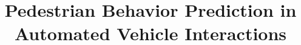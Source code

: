 \documentclass[letter,journal]{IEEEtran}
\begin{document}
%
\title{Pedestrian Behavior Prediction in Automated Vehicle Interactions}
%
%
%

        


% 
%



% 
\end{document}
